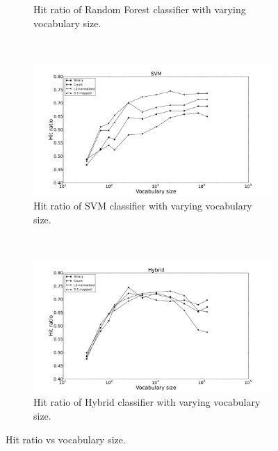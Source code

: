 \begin{figure}[H]
\begin{subfigure}[b]{\figwidth}
		\caption{Hit ratio of Random Forest classifier with varying vocabulary size.}
		\label{fig:hitratio-rf}
	\end{subfigure}
	~
	\begin{subfigure}[b]{\figwidth}
		\includegraphics[width=\textwidth]{img/SVM-hitrate-eps-converted-to.pdf}
		\caption{Hit ratio of SVM classifier with varying vocabulary size.}
		\label{fig:hitratio-svm}
	\end{subfigure}
	\\
	\begin{subfigure}[b]{\figwidth}
		\includegraphics[width=\textwidth]{img/Hybrid-hitrate-eps-converted-to.pdf}
		\caption{Hit ratio of Hybrid classifier with varying vocabulary size.}
		\label{fig:hitratio-hybrid}
	\end{subfigure}
	\caption{Hit ratio vs vocabulary size.}
	\label{fig:hitratio}
\end{figure}

